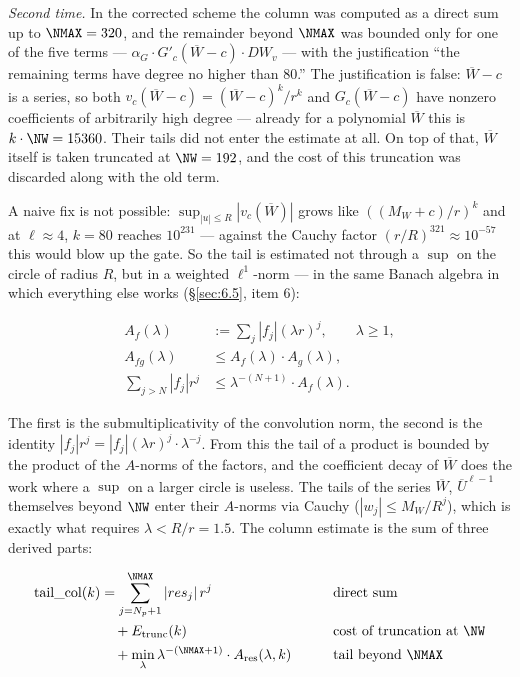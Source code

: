 \emph{Second time.} In the corrected scheme the column was computed as a
direct sum up to $\NMAX = 320$, and the remainder beyond
$\NMAX$ was bounded only for one of the five terms ---
$\alpha_{G}\cdot G'_{c}(\overline{W}-c)\cdot DW_{v}$ --- with the
justification ``the remaining terms have degree no higher than $80$.'' The
justification is false: $\overline{W}-c$ is a series, so both
$v_{c}(\overline{W}-c) = (\overline{W}-c)^{k}/r^{k}$ and
$G_{c}(\overline{W}-c)$ have nonzero coefficients of arbitrarily high degree
--- already for a polynomial $\overline{W}$ this is $k\cdot \NW = 15360$.
Their tails did not enter the estimate at all. On top of that,
$\overline{W}$ itself is taken truncated at $\NW = 192$, and the cost of
this truncation was discarded along with the old term.

A naive fix is not possible:
$\sup_{|u|\le R}|v_{c}(\overline{W})|$ grows like
$((M_{W}+c)/r)^{k}$ and at $\ell \approx 4$, $k = 80$ reaches $10^{231}$
--- against the Cauchy factor $(r/R)^{321} \approx 10^{-57}$ this would
blow up the gate. So the tail is estimated not through a $\sup$ on the
circle of radius $R$, but in a weighted $\ell^{1}$-norm --- in the same
Banach algebra in which everything else works (\S\ref{sec:6.5}, item 6):

\begin{align*}
A_{f}(\lambda) &:= \sum_{j} |f_{j}|(\lambda r)^{j} , \qquad \lambda \ge 1 , \\
A_{fg}(\lambda) &\le A_{f}(\lambda)\cdot A_{g}(\lambda) , \\
\sum_{j > N} |f_{j}| r^{j} &\le \lambda^{-(N+1)}\cdot A_{f}(\lambda) .
\end{align*}

The first is the submultiplicativity of the convolution norm, the second
is the identity $|f_{j}|r^{j} = |f_{j}|(\lambda r)^{j}\cdot \lambda^{-j}$.
From this the tail of a product is bounded by the product of the
$A$-norms of the factors, and the coefficient decay of $\overline{W}$ does
the work where a $\sup$ on a larger circle is useless. The tails of
the series $\overline{W}$, $\overline{U}^{\ell-1}$ themselves beyond
$\NW$ enter their $A$-norms via Cauchy ($|w_{j}| \le M_{W}/R^{j}$),
which is exactly what requires $\lambda < R/r = 1.5$. The column estimate
is the sum of three derived parts:

\begin{align*}
\mathrm{tail\_col}(k) &= \sum_{j=N_{p}+1}^{\NMAX} |res_{j}|\, r^{j}
      \qquad && \text{direct sum} \\
   &\quad + E_{\mathrm{trunc}}(k)
      \qquad && \text{cost of truncation at } \NW \\
   &\quad + \min_{\lambda} \lambda^{-(\NMAX+1)}\cdot A_{\mathrm{res}}(\lambda,k)
      \qquad && \text{tail beyond } \NMAX
\end{align*}

